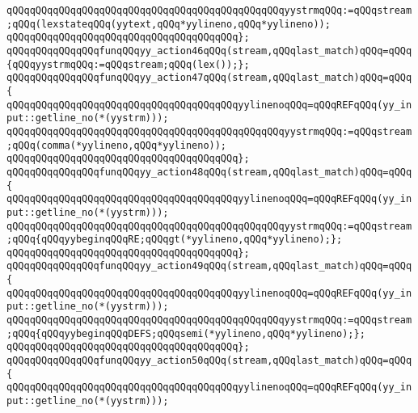 \newline
\verb|qQQqqQQqqQQqqQQqqQQqqQQqqQQqqQQqqQQqqQQqqQQqqQQqyystrmqQQq:=qQQqstream;qQQq(lexstateqQQq(yytext,qQQq*yylineno,qQQq*yylineno));|\newline
\verb|qQQqqQQqqQQqqQQqqQQqqQQqqQQqqQQqqQQqqQQq};|\newline
\verb|qQQqqQQqqQQqqQQqfunqQQqyy_action46qQQq(stream,qQQqlast_match)qQQq=qQQq{qQQqyystrmqQQq:=qQQqstream;qQQq(lex());};|\newline
\verb|qQQqqQQqqQQqqQQqfunqQQqyy_action47qQQq(stream,qQQqlast_match)qQQq=qQQq{|\newline
\verb|qQQqqQQqqQQqqQQqqQQqqQQqqQQqqQQqqQQqqQQqyylinenoqQQq=qQQqREFqQQq(yy_input::getline_no(*(yystrm)));|\newline
\newline
\verb|qQQqqQQqqQQqqQQqqQQqqQQqqQQqqQQqqQQqqQQqqQQqqQQqyystrmqQQq:=qQQqstream;qQQq(comma(*yylineno,qQQq*yylineno));|\newline
\verb|qQQqqQQqqQQqqQQqqQQqqQQqqQQqqQQqqQQqqQQq};|\newline
\verb|qQQqqQQqqQQqqQQqfunqQQqyy_action48qQQq(stream,qQQqlast_match)qQQq=qQQq{|\newline
\verb|qQQqqQQqqQQqqQQqqQQqqQQqqQQqqQQqqQQqqQQqyylinenoqQQq=qQQqREFqQQq(yy_input::getline_no(*(yystrm)));|\newline
\newline
\verb|qQQqqQQqqQQqqQQqqQQqqQQqqQQqqQQqqQQqqQQqqQQqqQQqyystrmqQQq:=qQQqstream;qQQq{qQQqyybeginqQQqRE;qQQqgt(*yylineno,qQQq*yylineno);};|\newline
\verb|qQQqqQQqqQQqqQQqqQQqqQQqqQQqqQQqqQQqqQQq};|\newline
\verb|qQQqqQQqqQQqqQQqfunqQQqyy_action49qQQq(stream,qQQqlast_match)qQQq=qQQq{|\newline
\verb|qQQqqQQqqQQqqQQqqQQqqQQqqQQqqQQqqQQqqQQqyylinenoqQQq=qQQqREFqQQq(yy_input::getline_no(*(yystrm)));|\newline
\newline
\verb|qQQqqQQqqQQqqQQqqQQqqQQqqQQqqQQqqQQqqQQqqQQqqQQqyystrmqQQq:=qQQqstream;qQQq{qQQqyybeginqQQqDEFS;qQQqsemi(*yylineno,qQQq*yylineno);};|\newline
\verb|qQQqqQQqqQQqqQQqqQQqqQQqqQQqqQQqqQQqqQQq};|\newline
\verb|qQQqqQQqqQQqqQQqfunqQQqyy_action50qQQq(stream,qQQqlast_match)qQQq=qQQq{|\newline
\verb|qQQqqQQqqQQqqQQqqQQqqQQqqQQqqQQqqQQqqQQqyylinenoqQQq=qQQqREFqQQq(yy_input::getline_no(*(yystrm)));|\newline
\newline

